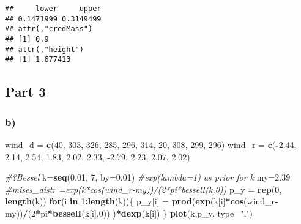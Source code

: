 \documentclass[]{article}
\newenvironment{Shaded}{\begin{snugshade}}{\end{snugshade}}
\newcommand{\CommentTok}[1]{\textcolor[rgb]{0.56,0.35,0.01}{\textit{#1}}}
\newcommand{\ControlFlowTok}[1]{\textcolor[rgb]{0.13,0.29,0.53}{\textbf{#1}}}
\newcommand{\DataTypeTok}[1]{\textcolor[rgb]{0.13,0.29,0.53}{#1}}
\newcommand{\DecValTok}[1]{\textcolor[rgb]{0.00,0.00,0.81}{#1}}
\newcommand{\FloatTok}[1]{\textcolor[rgb]{0.00,0.00,0.81}{#1}}
\newcommand{\KeywordTok}[1]{\textcolor[rgb]{0.13,0.29,0.53}{\textbf{#1}}}
\newcommand{\NormalTok}[1]{#1}
\newcommand{\OperatorTok}[1]{\textcolor[rgb]{0.81,0.36,0.00}{\textbf{#1}}}
\newcommand{\StringTok}[1]{\textcolor[rgb]{0.31,0.60,0.02}{#1}}
\begin{document}
\begin{verbatim}
##     lower     upper 
## 0.1471999 0.3149499 
## attr(,"credMass")
## [1] 0.9
## attr(,"height")
## [1] 1.677413
\end{verbatim}

\hypertarget{part-3}{%
\subsection{Part 3}\label{part-3}}

\hypertarget{b-2}{%
\subsubsection{b)}\label{b-2}}

\begin{Shaded}
\begin{Highlighting}[]
\NormalTok{wind_d =}\StringTok{ }\KeywordTok{c}\NormalTok{(}\DecValTok{40}\NormalTok{, }\DecValTok{303}\NormalTok{, }\DecValTok{326}\NormalTok{, }\DecValTok{285}\NormalTok{, }\DecValTok{296}\NormalTok{, }\DecValTok{314}\NormalTok{, }\DecValTok{20}\NormalTok{, }\DecValTok{308}\NormalTok{, }\DecValTok{299}\NormalTok{, }\DecValTok{296}\NormalTok{)}
\NormalTok{wind_r =}\StringTok{ }\KeywordTok{c}\NormalTok{(}\OperatorTok{-}\FloatTok{2.44}\NormalTok{, }\FloatTok{2.14}\NormalTok{, }\FloatTok{2.54}\NormalTok{, }\FloatTok{1.83}\NormalTok{, }\FloatTok{2.02}\NormalTok{, }\FloatTok{2.33}\NormalTok{, }\FloatTok{-2.79}\NormalTok{, }\FloatTok{2.23}\NormalTok{, }\FloatTok{2.07}\NormalTok{, }\FloatTok{2.02}\NormalTok{)}

\CommentTok{#?Bessel}
\NormalTok{k=}\KeywordTok{seq}\NormalTok{(}\FloatTok{0.01}\NormalTok{, }\DecValTok{7}\NormalTok{, }\DataTypeTok{by=}\FloatTok{0.01}\NormalTok{) }\CommentTok{#exp(lambda=1) as prior for k}
\NormalTok{my=}\FloatTok{2.39}
\CommentTok{#mises_distr =exp(k*cos(wind_r-my))/(2*pi*besselI(k,0)) }
\NormalTok{p_y =}\StringTok{ }\KeywordTok{rep}\NormalTok{(}\DecValTok{0}\NormalTok{, }\KeywordTok{length}\NormalTok{(k))}
\ControlFlowTok{for}\NormalTok{(i }\ControlFlowTok{in} \DecValTok{1}\OperatorTok{:}\KeywordTok{length}\NormalTok{(k))\{}
\NormalTok{  p_y[i] =}\StringTok{ }\KeywordTok{prod}\NormalTok{(}\KeywordTok{exp}\NormalTok{(k[i]}\OperatorTok{*}\KeywordTok{cos}\NormalTok{(wind_r}\OperatorTok{-}\NormalTok{my))}\OperatorTok{/}\NormalTok{(}\DecValTok{2}\OperatorTok{*}\NormalTok{pi}\OperatorTok{*}\KeywordTok{besselI}\NormalTok{(k[i],}\DecValTok{0}\NormalTok{)) )}\OperatorTok{*}\KeywordTok{dexp}\NormalTok{(k[i])}
\NormalTok{\}}
\KeywordTok{plot}\NormalTok{(k,p_y, }\DataTypeTok{type=}\StringTok{"l"}\NormalTok{)}
\end{Highlighting}
\end{Shaded}
\end{document}
